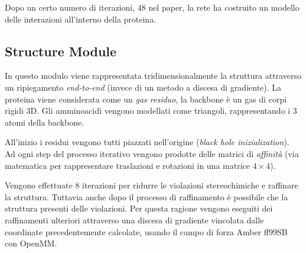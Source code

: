 Dopo un certo numero di iterazioni, 48 nel paper, la rete ha costruito un modello delle interazioni all'interno della proteina. 


\subsection{Structure Module}

In questo modulo viene rappresentata tridimensionalmente la struttura attraverso un ripiegamento \textit{end-to-end} (invece di un metodo a discesa di gradiente). La proteina viene considerata come un \textit{gas residuo}, la backbone è un gas di corpi rigidi 3D. Gli amminoacidi vengono modellati come triangoli, rappresentando i 3 atomi della backbone. 

\par All'inizio i residui vengono tutti piazzati nell'origine (\textit{black hole inizialization}). Ad ogni step del processo iterativo vengono prodotte delle matrici di \textit{affinità} (via matematica per rappresentare traslazioni e rotazioni in una matrice $4\times 4$).

\par Vengono effettuate 8 iterazioni per ridurre le violazioni stereochimiche e raffinare la struttura. Tuttavia anche dopo il processo di raffinamento è possibile che la struttura presenti delle violazioni. Per questa ragione vengono eseguiti dei raffinamenti ulteriori attraverso una discesa di gradiente vincolata dalle coordinate precedentemente calcolate, usando il campo di forza Amber ff99SB con OpenMM.

